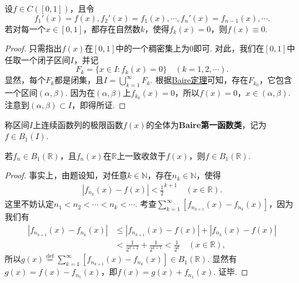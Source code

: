\documentclass[../../main.tex]{subfiles}%
\begin{document}
\begin{example}\label{example:例16}
设$f\in C([0,1])$，且令
\[
f_1'(x)=f(x), f_2'(x)=f_1(x), \cdots, f_n'(x)=f_{n - 1}(x), \cdots.
\]
若对每一个$x\in[0,1]$，都存在自然数$k$，使得$f_k(x)=0$，则$f(x)\equiv0$.
\end{example}
\begin{proof}
只需指出$f(x)$在$[0,1]$中的一个稠密集上为$0$即可. 对此，我们在$[0,1]$中任取一个闭子区间$I$，并记
\[
F_k=\{x\in I: f_k(x)=0\} \quad (k = 1,2,\cdots).
\]
显然，每个$F_k$都是闭集，且$I=\bigcup_{k = 1}^{\infty}F_k$. 根据\hyperref[theorem:Baire定理]{Baire定理}可知，存在$F_{k_0}$，它包含一个区间$(\alpha,\beta)$. 因为在$(\alpha,\beta)$上$f_{k_0}(x)=0$，所以$f(x)=0$，$x\in(\alpha,\beta)$. 注意到$(\alpha,\beta)\subset I$，即得所证. 
\end{proof}

\begin{definition}[Baire第一函数类]
称区间$I$上连续函数列的极限函数$f(x)$的全体为\textbf{Baire第一函数类}，记为$f\in B_1(I)$.
\end{definition}

\begin{theorem}\label{theorem:Baire第一函数类的性质1}
若$f_n\in B_1(\mathbb{R})$，且$f_n(x)$在$\mathbb{R}$上一致收敛于$f(x)$，则$f\in B_1(\mathbb{R})$.
\end{theorem}
\begin{proof}
事实上，由题设知，对任意$k\in\mathbb{N}$，存在$n_k\in\mathbb{N}$，使得
\begin{align*}
|f_{n_k}(x)-f(x)|<\frac{1}{2}^{k + 1} \quad (x\in\mathbb{R}).
\end{align*}
这里不妨认定$n_1 < n_2 < \cdots < n_k < \cdots$. 考查$\sum_{k = 1}^{\infty}[f_{n_{k + 1}}(x)-f_{n_k}(x)]$，因为我们有
\begin{align*}
|f_{n_{k + 1}}(x)-f_{n_k}(x)| &\leqslant |f_{n_{k + 1}}(x)-f(x)|+|f_{n_k}(x)-f(x)| \\
&<\frac{1}{2^{k + 2}}+\frac{1}{2^{k + 1}}<\frac{1}{2^{k}} \quad (x\in\mathbb{R}),
\end{align*}
所以$g(x)\stackrel{\text{def}}{=}\sum_{k = 1}^{\infty}[f_{n_{k + 1}}(x)-f_{n_k}(x)]\in B_1(\mathbb{R})$. 显然有$g(x)=f(x)-f_{n_1}(x)$，即$f(x)=g(x)+f_{n_1}(x)$. 证毕.
\end{proof}
\end{document}
